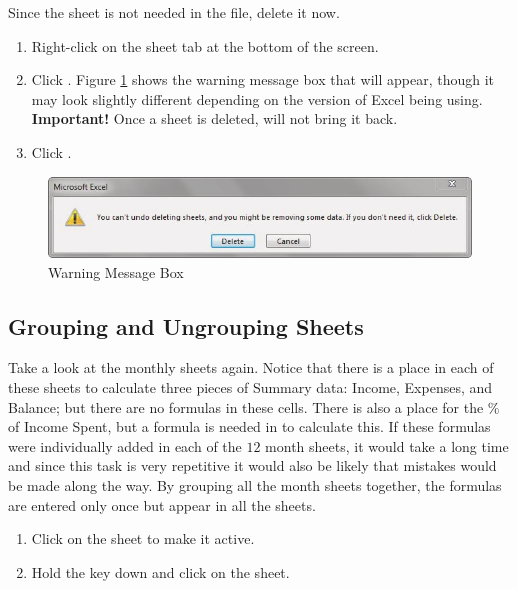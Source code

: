Since the  sheet is not needed in the  file, delete it now.

\begin{enumerate}
	\item Right-click on the  sheet tab at the bottom of the screen.
	\item Click . Figure \ref{06:fig03} shows the warning message box that will appear, though it may look slightly different depending on the version of Excel being using. \textbf{Important!} Once a sheet is deleted,  will not bring it back.
	\item Click .
\end{enumerate}

\begin{figure}[H]
	\centering
	\includegraphics[width=\maxwidth{.95\linewidth}]{gfx/ch06_fig03}
	\caption{Warning Message Box}
	\label{06:fig03}
\end{figure}

\subsection{Grouping and Ungrouping Sheets}

Take a look at the monthly sheets again. Notice that there is a place in each of these sheets to calculate three pieces of Summary data: Income, Expenses, and Balance; but there are no formulas in these cells. There is also a place for the \% of Income Spent, but a formula is needed in  to calculate this. If these formulas were individually added in each of the $ 12 $ month sheets, it would take a long time and since this task is very repetitive it would also be likely that mistakes would be made along the way. By grouping all the month sheets together, the formulas are entered only once but appear in all the sheets.

\begin{enumerate}
	\item Click on the  sheet to make it active.
	\item Hold the  key down and click on the  sheet.
\end{enumerate}

